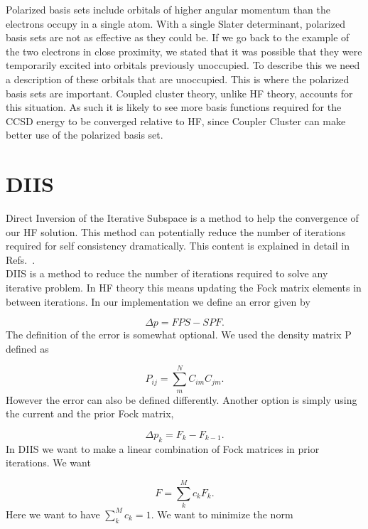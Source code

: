 \documentclass[a4paper,norsk,11pt,twoside]{report}
\begin{document}
Polarized basis sets include orbitals of higher angular momentum than
the electrons occupy in a single atom. With a single Slater
determinant, polarized basis sets are not as effective as they could
be. If we go back to the example of the two electrons in close
proximity, we stated that it was possible that they were temporarily
excited into orbitals previously unoccupied. To describe this we need
a description of these orbitals that are unoccupied. This is where the
polarized basis sets are important. Coupled cluster theory, unlike HF theory, accounts for this
situation. As such it is likely to see more basis functions required
for the CCSD energy to be converged relative to HF, since Coupler Cluster can make better use of the polarized basis set.  

\section{DIIS \label{diis_section_po_g}}
Direct Inversion of the Iterative Subspace is a method to help the
convergence of our HF solution. This method can potentially reduce the
number of iterations required for self consistency dramatically. This
content is explained in detail in Refs.~\cite{diis_citation1,diis_citation2,diis_citation3}.
\\

DIIS is a method to reduce the number of iterations required to solve
any iterative problem. In HF theory this means updating the Fock matrix
elements in between iterations. In our implementation we define an
error given by

\begin{equation}
\Delta p = FPS - SPF .
\end{equation}
The definition of the error is somewhat optional. We used the density matrix P defined as

\begin{equation}
P_{ij} = \sum_{m}^N C_{im} C_{jm} .
\end{equation}
However the error can also be defined differently. Another option is simply using the current and the prior Fock matrix,

\begin{equation}
\Delta p_k = F_k - F_{k-1} .
\end{equation}
In DIIS we want to make a linear combination of Fock matrices in prior iterations. We want

\begin{equation}
F = \sum_k^M c_k F_k .
\end{equation}
Here we want to have $\sum_k^M c_k = 1$. We want to minimize the norm
\end{document}
